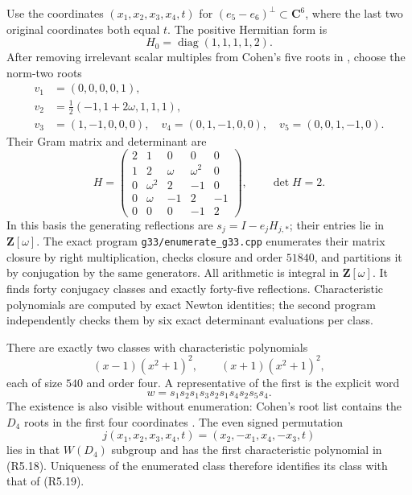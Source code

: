 Use the coordinates $(x_1,x_2,x_3,x_4,t)$ for
$(e_5-e_6)^\perp\subset\mathbf C^6$, where the last two original
coordinates both equal $t$.  The positive Hermitian form is
\[
                         H_0=\operatorname{diag}(1,1,1,1,2).
\]
After removing irrelevant scalar multiples from Cohen's five roots
in \cite[\S4.15, p.~409]{FIELD:Cohen}, choose the norm-two roots
\[
 \begin{split}
 v_1&=(0,0,0,0,1),\\
 v_2&=\tfrac12(-1,1+2\omega,1,1,1),\\
 v_3&=(1,-1,0,0,0),\quad v_4=(0,1,-1,0,0),\quad
 v_5=(0,0,1,-1,0).
 \end{split}
\]
Their Gram matrix and determinant are
\[
 H=\begin{pmatrix}
 2&1&0&0&0\\
 1&2&\omega&\omega^2&0\\
 0&\omega^2&2&-1&0\\
 0&\omega&-1&2&-1\\
 0&0&0&-1&2
 \end{pmatrix},\qquad \det H=2.
                                                               \tag{R5.17}
\]
In this basis the generating reflections are
$s_j=I-e_j H_{j,*}$; their entries lie in $\mathbf Z[\omega]$.
The exact program \texttt{g33/enumerate\_g33.cpp} enumerates their
matrix closure by right multiplication, checks closure and order
$51840$, and partitions it by conjugation by the same generators.
All arithmetic is integral in $\mathbf Z[\omega]$.
It finds forty conjugacy classes and exactly forty-five reflections.
Characteristic polynomials are computed by exact Newton identities;
the second program independently checks them by six exact determinant
evaluations per class.

There are exactly two classes with characteristic polynomials
\[
                 (x-1)(x^2+1)^2,
                 \qquad (x+1)(x^2+1)^2,
                                                               \tag{R5.18}
\]
each of size $540$ and order four.  A representative of the first is
the explicit word
\[
               w=s_1s_2s_1s_3s_2s_1s_4s_2s_5s_4.
                                                               \tag{R5.19}
\]
The existence is also visible without enumeration: Cohen's root list
contains the $D_4$ roots in the first four coordinates
\cite[pp.~409--410 and the $D_4$ stabilizer argument, p.~413]{FIELD:Cohen}.
The even signed permutation
\[
        j(x_1,x_2,x_3,x_4,t)=(x_2,-x_1,x_4,-x_3,t)
\]
lies in that $W(D_4)$ subgroup and has the first characteristic
polynomial in (R5.18).  Uniqueness of the enumerated class therefore
identifies its class with that of (R5.19).

